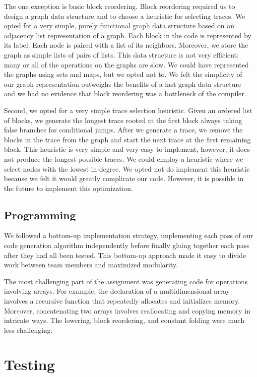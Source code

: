 \documentclass{hw}
\begin{document}
The one exception is basic block reordering. Block reordering required us to
design a graph data structure and to choose a heuristic for selecting traces.
We opted for a very simple, purely functional graph data structure based on an
adjacency list representation of a graph. Each block in the code is represented
by its label. Each node is paired with a list of its neighbors. Moreover, we
store the graph as simple lists of pairs of lists. This data structure is not
very efficient; many or all of the operations on the graphs are slow. We could
have represented the graphs using sets and maps, but we opted not to. We felt
the simplicity of our graph representation outweighs the benefits of a fast
graph data structure and we had no evidence that block reordering was a
bottleneck of the compiler.

Second, we opted for a very simple trace selection heuristic. Given an ordered
list of blocks, we generate the longest trace rooted at the first block always
taking false branches for conditional jumps. After we generate a trace, we
remove the blocks in the trace from the graph and start the next trace at the
first remaining block. This heuristic is very simple and very easy to
implement, however, it does not produce the longest possible traces. We could
employ a heuristic where we select nodes with the lowest in-degree. We opted
not do implement this heuristic because we felt it would greatly complicate our
code. However, it is possible in the future to implement this optimization.

\subsection{Programming}
We followed a bottom-up implementation strategy, implementing each pass of our
code generation algorithm independently before finally gluing together each
pass after they had all been tested. This bottom-up approach made it easy to
divide work between team members and maximized modularity.

The most challenging part of the assignment was generating code for operations
involving arrays. For example, the declaration of a multidimensional array
involves a recursive function that repeatedly allocates and initializes memory.
Moreover, concatenating two arrays involves reallocating and copying memory in
intricate ways. The lowering, block reordering, and constant folding were much
less challenging.

\section{Testing}\label{sec:testing}
\end{document}

